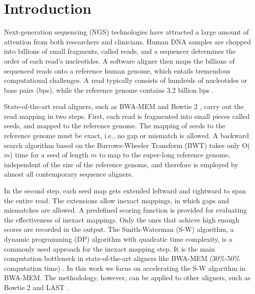 \section{Introduction} 
\label{sec:introduction}

Next-generation sequencing (NGS) technologies have attracted a large amount of attention from both researchers and clinicians. 
Human DNA samples are chopped into billions of small fragments, called reads, and a sequencer determines the order of each read's nucleotides. 
A software aligner then maps the billions of sequenced reads onto a reference human genome, which entails tremendous computational challenges.
A read typically consists of hundreds of nucleotides or base pairs (bps), while the reference genome contains 3.2 billion bps \cite{Mardis2008}.

State-of-the-art read aligners, such as BWA-MEM \cite{BWA-MEM} and Bowtie 2 \cite{Bowtie2}, 
carry out the read mapping in two steps. 
First, each read is fragmented into small pieces called seeds, and mapped to the reference genome. 
The mapping of seeds to the reference genome must be exact, i.e., no gap or mismatch is allowed. 
A backward search algorithm based on the Burrows-Wheeler Transform (BWT) \cite{BWT} takes only O($m$) time for a seed of length $m$ to map to the super-long reference genome, independent of the size of the reference genome, and therefore is employed by almost all contemporary sequence aligners.

In the second step, each seed map gets extended leftward and rightward to span the entire read. 
The extensions allow inexact mappings, in which gaps and mismatches are allowed. A predefined scoring function is provided for evaluating the effectiveness of inexact mappings. Only the ones that achieve high enough scores are recorded in the output. 
The Smith-Waterman (S-W) algorithm, a dynamic programming (DP) algorithm with quadratic time complexity, is a commonly used approach for the inexact mapping step. 
It is the main computation bottleneck in state-of-the-art aligners like BWA-MEM (30\%-50\% computation time) \cite{BWA-MEM}. 
In this work we focus on accelerating the S-W algorithm in BWA-MEM. The methodology, however, can be applied to other aligners, such as Bowtie 2 \cite{Bowtie2} and LAST \cite{LAST}. 

